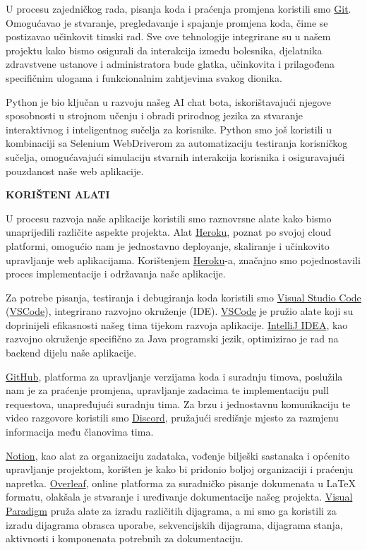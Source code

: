 U procesu zajedničkog rada, pisanja koda i praćenja promjena koristili smo \href{https://git-scm.com/}{Git}. Omogućavao je stvaranje, pregledavanje i spajanje promjena koda, čime se postizavao učinkovit timski rad. Sve ove tehnologije integrirane su u našem projektu kako bismo osigurali da interakcija između bolesnika, djelatnika zdravstvene ustanove i administratora bude glatka, učinkovita i prilagođena specifičnim ulogama i funkcionalnim zahtjevima svakog dionika.

Python je bio ključan u razvoju našeg AI chat bota, iskorištavajući njegove sposobnosti u strojnom učenju i obradi prirodnog jezika za stvaranje interaktivnog i inteligentnog sučelja za korisnike. Python smo još koristili u kombinaciji sa Selenium WebDriverom za automatizaciju testiranja korisničkog sučelja, omogućavajući simulaciju stvarnih interakcija korisnika i osiguravajući pouzdanost naše web aplikacije.

\textbf{KORIŠTENI ALATI
}

U procesu razvoja naše aplikacije koristili smo raznovrsne alate kako bismo unaprijedili različite aspekte projekta. Alat \href{https://www.heroku.com}{Heroku}, poznat po svojoj cloud platformi, omogućio nam je jednostavno deployanje, skaliranje i učinkovito upravljanje web aplikacijama. Korištenjem \href{https://www.heroku.com}{Heroku}-a, značajno smo pojednostavili proces implementacije i održavanja naše aplikacije.

Za potrebe pisanja, testiranja i debugiranja koda koristili smo \href{https://www.visualstudio.com}{Visual Studio Code} (\href{https://www.visualstudio.com}{VSCode}), integrirano razvojno okruženje (IDE). \href{https://www.visualstudio.com}{VSCode} je pružio alate koji su doprinijeli efikasnosti našeg tima tijekom razvoja aplikacije. \href{https://www.jetbrains.com/idea}{IntelliJ IDEA}, kao razvojno okruženje specifično za Java programski jezik, optimizirao je rad na backend dijelu naše aplikacije. 

\href{https://github.com}{GitHub}, platforma za upravljanje verzijama koda i suradnju timova, poslužila nam je za praćenje promjena, upravljanje zadacima te implementaciju pull requestova, unapređujući suradnju tima. Za brzu i jednostavnu komunikaciju te video razgovore koristili smo \href{https://discord.com}{Discord}, pružajući središnje mjesto za razmjenu informacija među članovima tima.


\href{https://www.notion.so}{Notion}, kao alat za organizaciju zadataka, vođenje bilješki sastanaka i općenito upravljanje projektom, korišten je kako bi pridonio boljoj organizaciji i praćenju napretka. \href{https://www.overleaf.com}{Overleaf}, online platforma za suradničko pisanje dokumenata u LaTeX formatu, olakšala je stvaranje i uređivanje dokumentacije našeg projekta.
\href{https://www.visual-paradigm.com}{Visual Paradigm} pruža alate za izradu različitih dijagrama, a mi smo ga koristili za izradu dijagrama obrasca uporabe, sekvencijskih dijagrama, dijagrama stanja, aktivnosti i komponenata potrebnih za dokumentaciju. 

